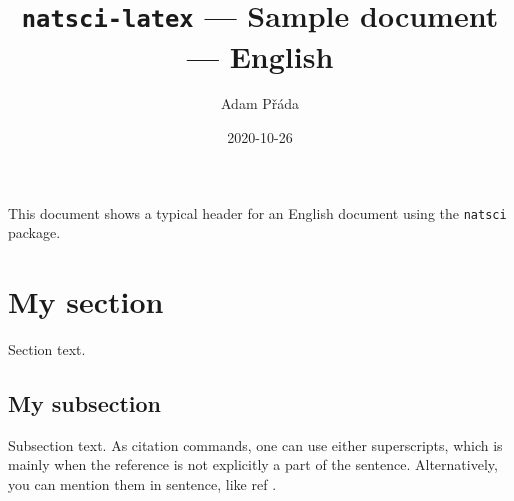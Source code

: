 \documentclass[11pt]{article}
\title{\texttt{natsci-latex} --- Sample document --- English}
\author{Adam Přáda}
\date{2020-10-26}
\begin{document}
    \pagestyle{fancy}
    \maketitle
    This document shows a typical header for an English document using the \texttt{natsci} package.
    
    \section{My section}
    Section text.
    \subsection{My subsection}
    Subsection text.
    \newpage
    As citation commands, one can use either superscripts, which is mainly when the reference is not explicitly a part of the sentence.\supercite{cit1} Alternatively, you can mention them in sentence, like ref \cite{cit2}.
    \printbibliography
\end{document}
